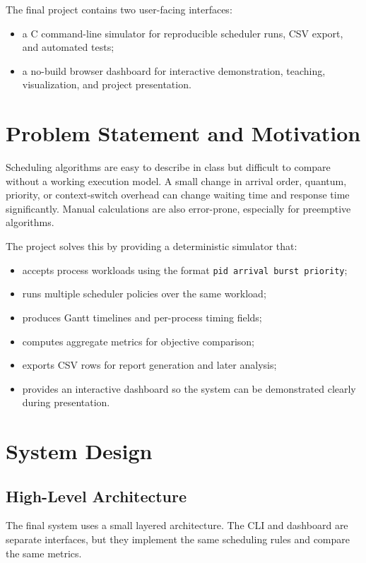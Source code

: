 \documentclass[11pt]{article}
\begin{document}
The final project contains two user-facing interfaces:

\begin{itemize}
  \item a C command-line simulator for reproducible scheduler runs, CSV export,
  and automated tests;
  \item a no-build browser dashboard for interactive demonstration, teaching,
  visualization, and project presentation.
\end{itemize}

\section{Problem Statement and Motivation}

Scheduling algorithms are easy to describe in class but difficult to compare
without a working execution model. A small change in arrival order, quantum,
priority, or context-switch overhead can change waiting time and response time
significantly. Manual calculations are also error-prone, especially for
preemptive algorithms.

The project solves this by providing a deterministic simulator that:

\begin{itemize}
  \item accepts process workloads using the format \texttt{pid arrival burst priority};
  \item runs multiple scheduler policies over the same workload;
  \item produces Gantt timelines and per-process timing fields;
  \item computes aggregate metrics for objective comparison;
  \item exports CSV rows for report generation and later analysis;
  \item provides an interactive dashboard so the system can be demonstrated
  clearly during presentation.
\end{itemize}

\section{System Design}

\subsection{High-Level Architecture}

The final system uses a small layered architecture. The CLI and dashboard are
separate interfaces, but they implement the same scheduling rules and compare
the same metrics.
\end{document}
